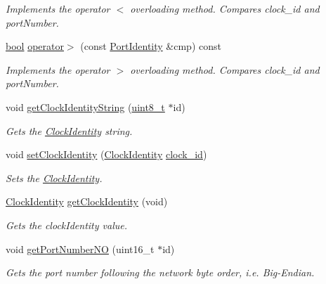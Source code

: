 \begin{DoxyCompactItemize}
\begin{DoxyCompactList}\small\item\em Implements the operator \textquotesingle{}$<$\textquotesingle{} overloading method. Compares clock\+\_\+id and port\+Number. \end{DoxyCompactList}\item 
\hyperlink{avb__gptp_8h_af6a258d8f3ee5206d682d799316314b1}{bool} \hyperlink{class_port_identity_a932d5186b9a468fd448c10475bcdfb72}{operator$>$} (const \hyperlink{class_port_identity}{Port\+Identity} \&cmp) const 
\begin{DoxyCompactList}\small\item\em Implements the operator \textquotesingle{}$>$\textquotesingle{} overloading method. Compares clock\+\_\+id and port\+Number. \end{DoxyCompactList}\item 
void \hyperlink{class_port_identity_a2047fe8013d08f14ac579d604e2efd7e}{get\+Clock\+Identity\+String} (\hyperlink{stdint_8h_aba7bc1797add20fe3efdf37ced1182c5}{uint8\+\_\+t} $\ast$id)
\begin{DoxyCompactList}\small\item\em Gets the \hyperlink{class_clock_identity}{Clock\+Identity} string. \end{DoxyCompactList}\item 
void \hyperlink{class_port_identity_abb9510d7ee3a171a6d55ab2cec30d3a6}{set\+Clock\+Identity} (\hyperlink{class_clock_identity}{Clock\+Identity} \hyperlink{class_port_identity_a263e1028b568de892cf4a0b576693cbe}{clock\+\_\+id})
\begin{DoxyCompactList}\small\item\em Sets the \hyperlink{class_clock_identity}{Clock\+Identity}. \end{DoxyCompactList}\item 
\hyperlink{class_clock_identity}{Clock\+Identity} \hyperlink{class_port_identity_a6cfd51581c2881ac89d7ed113d798a87}{get\+Clock\+Identity} (void)
\begin{DoxyCompactList}\small\item\em Gets the clock\+Identity value. \end{DoxyCompactList}\item 
void \hyperlink{class_port_identity_ae22242effe1001dc666522e6019fd494}{get\+Port\+Number\+NO} (uint16\+\_\+t $\ast$id)
\begin{DoxyCompactList}\small\item\em Gets the port number following the network byte order, i.\+e. Big-\/\+Endian. \end{DoxyCompactList}\item 

\end{DoxyCompactItemize}
